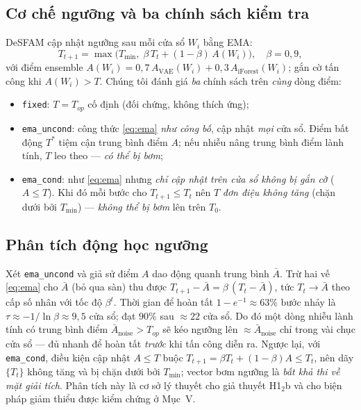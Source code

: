 \documentclass[conference,10pt]{IEEEtran}
\begin{document}
\subsection{Cơ chế ngưỡng và ba chính sách kiểm tra}
DeSFAM cập nhật ngưỡng sau mỗi cửa sổ $W_i$ bằng EMA:
\begin{equation}
T_{t+1} = \max\!\big(T_{\min},\; \beta\,T_t + (1-\beta)\,A(W_i)\big),\quad \beta=0{,}9,
\label{eq:ema}
\end{equation}
với điểm ensemble $A(W_i)=0{,}7\,A_{\text{VAE}}(W_i)+0{,}3\,A_{\text{iForest}}(W_i)$; gắn cờ tấn công khi $A(W_i)>T$. Chúng tôi đánh giá \textit{ba} chính sách trên \textit{cùng} dòng điểm:
\begin{itemize}
\item \texttt{fixed}: $T=T_{op}$ cố định (đối chứng, không thích ứng);
\item \texttt{ema\_uncond}: công thức \eqref{eq:ema} \textit{như công bố}, cập nhật \textit{mọi} cửa sổ. Điểm bất động $T^\ast$ tiệm cận trung bình điểm $A$; nếu nhiễu nâng trung bình điểm lành tính, $T$ leo theo — \textit{có thể bị bơm};
\item \texttt{ema\_cond}: như \eqref{eq:ema} nhưng \textit{chỉ cập nhật trên cửa sổ không bị gắn cờ} ($A\le T$). Khi đó mỗi bước cho $T_{t+1}\le T_t$ nên $T$ \textit{đơn điệu không tăng} (chặn dưới bởi $T_{\min}$) — \textit{không thể bị bơm} lên trên $T_0$.
\end{itemize}

\subsection{Phân tích động học ngưỡng}
Xét \texttt{ema\_uncond} và giả sử điểm $A$ dao động quanh trung bình $\bar A$. Trừ hai vế \eqref{eq:ema} cho $\bar A$ (bỏ qua sàn) thu được $T_{t+1}-\bar A = \beta\,(T_t-\bar A)$, tức $T_t \to \bar A$ theo cấp số nhân với tốc độ $\beta^{t}$. Thời gian để hoàn tất $1-e^{-1}\approx 63\%$ bước nhảy là $\tau \approx -1/\ln\beta \approx 9{,}5$ cửa sổ; đạt $90\%$ sau $\approx 22$ cửa sổ. Do đó một dòng nhiễu lành tính có trung bình điểm $\bar A_{\text{noise}} > T_{op}$ sẽ kéo ngưỡng lên $\approx \bar A_{\text{noise}}$ chỉ trong vài chục cửa sổ — đủ nhanh để hoàn tất \textit{trước} khi tấn công diễn ra. Ngược lại, với \texttt{ema\_cond}, điều kiện cập nhật $A\le T$ buộc $T_{t+1}=\beta T_t+(1-\beta)A \le T_t$, nên dãy $\{T_t\}$ không tăng và bị chặn dưới bởi $T_{\min}$; vector bơm ngưỡng là \textit{bất khả thi về mặt giải tích}. Phân tích này là cơ sở lý thuyết cho giả thuyết H1$_2$b và cho biện pháp giảm thiểu được kiểm chứng ở Mục~V.
\end{document}
